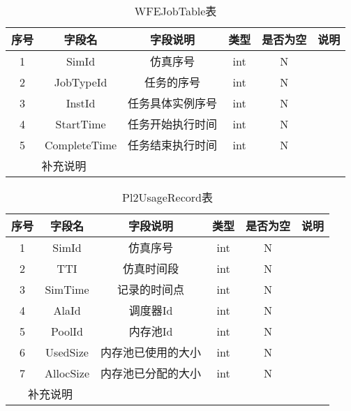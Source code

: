 \begin{table}[!h]
    \centering\normalsize
    \caption{WFEJobTable表}
    \begin{tabular}{|c|c|c|c|c|c|}
    \hline
    \textbf{序号} & \textbf{字段名} & \textbf{字段说明} & \textbf{类型} & \textbf{是否为空} & \textbf{说明} \\ \hline
    1           & SimId        & 仿真序号          & int         & N             &             \\ \hline
    2           & JobTypeId    & 任务的序号         & int         & N             &             \\ \hline
    3           & InstId       & 任务具体实例序号      & int         & N             &             \\ \hline
    4           & StartTime    & 任务开始执行时间      & int         & N             &             \\ \hline
    5           & CompleteTime & 任务结束执行时间      & int         & N             &             \\ \hline
    \multicolumn{2}{|c|}{补充说明} &               &             &               &             \\ \hline
    \end{tabular}
    \end{table}

\begin{table}[!h]
    \centering\normalsize
    \caption{Pl2UsageRecord表}
    \begin{tabular}{|c|c|c|c|c|c|}
    \hline
    \textbf{序号} & \textbf{字段名} & \textbf{字段说明} & \textbf{类型} & \textbf{是否为空} & \textbf{说明} \\ \hline
    1           & SimId        & 仿真序号          & int         & N             &             \\ \hline
    2           & TTI          & 仿真时间段         & int         & N             &             \\ \hline
    3           & SimTime      & 记录的时间点        & int         & N             &             \\ \hline
    4           & AlaId        & 调度器Id         & int         & N             &             \\ \hline
    5           & PoolId       & 内存池Id         & int         & N             &             \\ \hline
    6           & UsedSize     & 内存池已使用的大小     & int         & N             &             \\ \hline
    7           & AllocSize    & 内存池已分配的大小     & int         & N             &             \\ \hline
    \multicolumn{2}{|c|}{补充说明} &               &             &               &             \\ \hline
    \end{tabular}
    \end{table}

